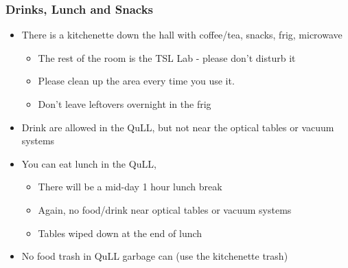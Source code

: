 \documentclass{beamer}
\begin{document}
\begin{frame}\frametitle{Drinks, Lunch and Snacks}
\begin{itemize}
\item There is a kitchenette down the hall with coffee/tea, snacks, frig, microwave
\begin{itemize}
\item The rest of the room is the TSL Lab - please don't disturb it
\item Please clean up the area every time you use it.
\item Don't leave leftovers overnight in the frig
\end{itemize}
\item Drink are allowed in the QuLL, but not near the optical tables or vacuum systems
\item You can eat lunch in the QuLL, 
\begin{itemize}
\item There will be a mid-day 1 hour lunch break
\item Again, no food/drink near optical tables or vacuum systems
\item Tables wiped down at the end of lunch
\end{itemize}
\item No food trash in QuLL garbage can (use the kitchenette trash)
\end{itemize}
\end{frame}
\end{document}
